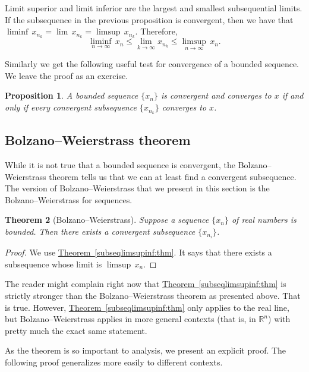 \documentclass[12pt]{book}
\newcommand{\R}{{\mathbb{R}}}
\theoremstyle{plain}
\newtheorem{thm}{Theorem}[section]
\newtheorem{prop}[thm]{Proposition}
\theoremstyle{remark}
\theoremstyle{definition}
\theoremstyle{exercise}
\theoremstyle{example}
\newcommand{\thmref}[1]{\hyperref[#1]{Theorem~\ref*{#1}}}
\begin{document}
Limit superior and limit inferior
are the largest and smallest
subsequential limits.  If the subsequence in the previous
proposition is convergent, then we have that
$\liminf \, x_{n_k} = \lim\, x_{n_k} = \limsup \, x_{n_k}$.  Therefore,
\begin{equation*}
\liminf_{n\to\infty} \, x_n \leq
\lim_{k\to\infty} x_{n_k} \leq
\limsup_{n\to\infty} \, x_n .
\end{equation*}

Similarly we get the following useful test for convergence
of a bounded sequence.  We leave the proof as an exercise.

\begin{prop} \label{seqconvsubseqconv:prop}
A bounded sequence $\{ x_n \}$ is convergent and converges to $x$
if and only if
every convergent subsequence
$\{ x_{n_k} \}$ converges to $x$.
\end{prop}

\subsection{Bolzano--Weierstrass theorem}

While it is not true that a bounded sequence is convergent, the
Bolzano--Weierstrass theorem tells us that we can at least find a convergent
subsequence.
The version of Bolzano--Weierstrass 
that we present in this section is the Bolzano--Weierstrass for
sequences.

\begin{thm}[Bolzano--Weierstrass]\label{thm:bwseq}
Suppose a sequence $\{ x_n \}$ of real numbers is bounded.
Then there exists a convergent subsequence $\{ x_{n_i} \}$.
\end{thm}

\begin{proof}
We use \thmref{subseqlimsupinf:thm}.  It says that there exists
a subsequence whose limit is $\limsup \, x_n$.
\end{proof}

The reader might complain right now that 
\thmref{subseqlimsupinf:thm} is strictly stronger than the
Bolzano--Weierstrass theorem as presented above.  That is true.
However, 
\thmref{subseqlimsupinf:thm} only applies to the real line, but
Bolzano--Weierstrass applies in more general contexts (that is, in $\R^n$)
with pretty much the exact same statement.

As the theorem is so important to analysis, we present an explicit
proof.
The following proof generalizes more easily to different contexts.
\end{document}
